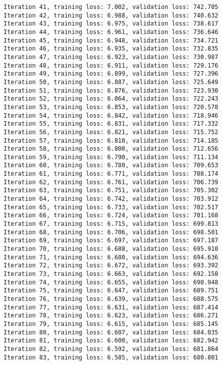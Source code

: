 \documentclass[11pt]{article}
\begin{document}
\begin{Verbatim}[commandchars=\\\{\}]
Iteration 41, training loss: 7.002, validation loss: 742.705
Iteration 42, training loss: 6.988, validation loss: 740.632
Iteration 43, training loss: 6.975, validation loss: 738.617
Iteration 44, training loss: 6.961, validation loss: 736.646
Iteration 45, training loss: 6.948, validation loss: 734.721
Iteration 46, training loss: 6.935, validation loss: 732.835
Iteration 47, training loss: 6.923, validation loss: 730.987
Iteration 48, training loss: 6.911, validation loss: 729.176
Iteration 49, training loss: 6.899, validation loss: 727.396
Iteration 50, training loss: 6.887, validation loss: 725.649
Iteration 51, training loss: 6.876, validation loss: 723.930
Iteration 52, training loss: 6.864, validation loss: 722.243
Iteration 53, training loss: 6.853, validation loss: 720.578
Iteration 54, training loss: 6.842, validation loss: 718.946
Iteration 55, training loss: 6.831, validation loss: 717.332
Iteration 56, training loss: 6.821, validation loss: 715.752
Iteration 57, training loss: 6.810, validation loss: 714.185
Iteration 58, training loss: 6.800, validation loss: 712.656
Iteration 59, training loss: 6.790, validation loss: 711.134
Iteration 60, training loss: 6.780, validation loss: 709.653
Iteration 61, training loss: 6.771, validation loss: 708.174
Iteration 62, training loss: 6.761, validation loss: 706.739
Iteration 63, training loss: 6.751, validation loss: 705.302
Iteration 64, training loss: 6.742, validation loss: 703.912
Iteration 65, training loss: 6.733, validation loss: 702.517
Iteration 66, training loss: 6.724, validation loss: 701.168
Iteration 67, training loss: 6.715, validation loss: 699.813
Iteration 68, training loss: 6.706, validation loss: 698.501
Iteration 69, training loss: 6.697, validation loss: 697.187
Iteration 70, training loss: 6.688, validation loss: 695.910
Iteration 71, training loss: 6.680, validation loss: 694.636
Iteration 72, training loss: 6.672, validation loss: 693.392
Iteration 73, training loss: 6.663, validation loss: 692.158
Iteration 74, training loss: 6.655, validation loss: 690.948
Iteration 75, training loss: 6.647, validation loss: 689.751
Iteration 76, training loss: 6.639, validation loss: 688.575
Iteration 77, training loss: 6.631, validation loss: 687.414
Iteration 78, training loss: 6.623, validation loss: 686.271
Iteration 79, training loss: 6.615, validation loss: 685.145
Iteration 80, training loss: 6.607, validation loss: 684.035
Iteration 81, training loss: 6.600, validation loss: 682.942
Iteration 82, training loss: 6.592, validation loss: 681.864
Iteration 83, training loss: 6.585, validation loss: 680.801

\end{Verbatim}
\end{document}
